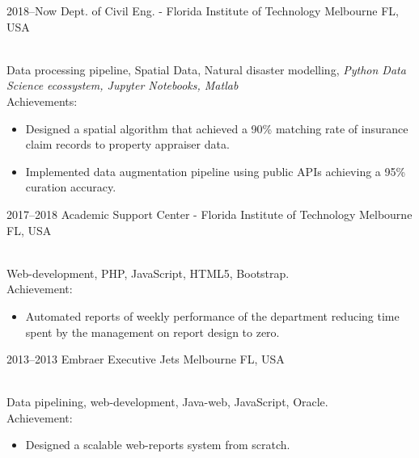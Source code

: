 \documentclass[]{cv-style}          %
\begin{document}
\begin{entrylist}
\entry
  {2018--Now}
  {Dept. of Civil Eng. - Florida Institute of Technology}
  {Melbourne FL, USA}
  {\\
  Data processing pipeline, Spatial Data, Natural disaster modelling, \textit{Python Data Science ecossystem, Jupyter Notebooks, Matlab}\\
    Achievements:
  \begin{itemize}
    \item Designed a spatial algorithm that achieved a 90\% matching rate of insurance claim records to property appraiser data.
    \item Implemented data augmentation pipeline using public APIs achieving a 95\% curation accuracy.
  \end{itemize}}
\entry
  {2017--2018}
  {Academic Support Center - Florida Institute of Technology}
  {Melbourne FL, USA}
  {\\
  Web-development, PHP, JavaScript, HTML5, Bootstrap.\\
  Achievement:
  \begin{itemize}
    \item Automated reports of weekly performance of the department reducing time spent by the management on report design to zero.
  \end{itemize}}
\entry
  {2013--2013}
  {Embraer Executive Jets}
  {Melbourne FL, USA}
  {\\
  Data pipelining, web-development, Java-web, JavaScript,  Oracle.\\
  Achievement:
  \begin{itemize}
    \item Designed a scalable web-reports system from scratch.
  \end{itemize}}
\end{entrylist}

\vspace{-.5cm}
\end{document}
